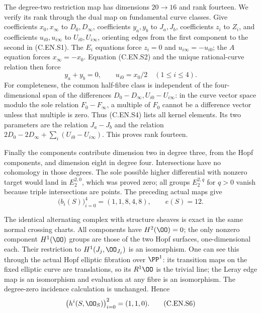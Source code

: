 The degree-two restriction map has dimensions $20\to16$
and rank fourteen. We verify its rank through the dual map
on fundamental curve classes. Give coefficients
$x_0,x_\infty$ to $D_0,D_\infty$, coefficients $y_a,y_b$
to $J_a,J_b$, coefficients $z_i$ to $Z_i$, and coefficients
$u_{i0},u_{i\infty}$ to $U_{i0},U_{i\infty}$, orienting
edges from the first component to the second in (C.EN.S1).
The $E_i$ equations force
$z_i=0$ and $u_{i\infty}=-u_{i0}$; the $A$ equation
forces $x_\infty=-x_0$. Equation (C.EN.S2) and the unique
rational-curve relation then force
\[
 y_a+y_b=0,\qquad u_{i0}=x_0/2\quad(1\le i\le4).
                                                               \tag{C.EN.S4}
\]
For completeness, the common half-fibre class is independent
of the four-dimensional span of the differences
$D_0-D_\infty,U_{i0}-U_{i\infty}$: in the curve vector
space modulo the sole relation $F_0-F_\infty$, a multiple
of $F_0$ cannot be a difference vector unless that multiple
is zero. Thus (C.EN.S4) lists all kernel elements. Its two
parameters are the relation $J_a-J_b$ and the relation
$2D_0-2D_\infty+\sum_i(U_{i0}-U_{i\infty})$.
This proves rank fourteen.

Finally the components contribute dimension two in degree
three, from the Hopf components, and dimension eight in
degree four. Intersections have no cohomology in those
degrees. The sole possible higher differential with nonzero
target would land in $E_2^{2,0}$, which was proved zero;
all groups $E_2^{2,q}$ for $q>0$ vanish because triple
intersections are points. The preceding actual maps give
\[
 \bigl(b_i(S)\bigr)_{i=0}^4=(1,1,8,4,8),\qquad e(S)=12.
                                                               \tag{C.EN.S5}
\]

The identical alternating complex with structure sheaves
is exact in the same normal crossing charts. All components
have $H^2(\OO)=0$; the only nonzero component $H^1(\OO)$
groups are those of the two Hopf surfaces, one-dimensional
each. Their restriction to $H^1(J_j,\OO_{J_j})$ is an
isomorphism. One can see this through the actual Hopf
elliptic fibration over $\PP^1$: its transition maps on the
fixed elliptic curve are translations, so its $R^1\OO$
is the trivial line; the Leray edge map is an isomorphism
and evaluation at any fibre is an isomorphism. The degree-zero
incidence calculation is unchanged. Hence
\[
 \bigl(h^i(S,\OO_S)\bigr)_{i=0}^2=(1,1,0).
                                                               \tag{C.EN.S6}
\]

